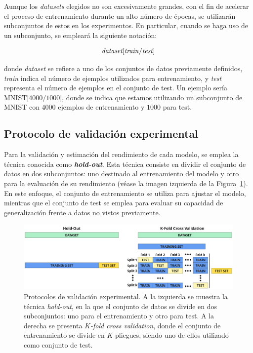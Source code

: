Aunque los \textit{datasets} elegidos no son excesivamente grandes, con el fin de acelerar el proceso de entrenamiento durante un alto número de épocas, se utilizarán subconjuntos de estos en los experimentos. En particular, cuando se haga uso de un subconjunto, se empleará la siguiente notación:

\[
    \textit{dataset}[\text{\textit{train}/\textit{test}}]
\]

donde \textit{dataset} se refiere a uno de los conjuntos de datos previamente definidos, \textit{train} indica el número de ejemplos utilizados para entrenamiento, y \textit{test} representa el número de ejemplos en el conjunto de test. Un ejemplo sería MNIST[$4000/1000$], donde se indica que estamos utilizando un subconjunto de MNIST con $4000$ ejemplos de entrenamiento y $1000$ para test.

\subsection{Protocolo de validación experimental}\label{subsec:protocolo-experimental}

Para la validación y estimación del rendimiento de cada modelo, se emplea la técnica conocida como \textbf{\textit{hold-out}}. Esta técnica consiste en dividir el conjunto de datos en dos subconjuntos: uno destinado al entrenamiento del modelo y otro para la evaluación de su rendimiento (véase la imagen izquierda de la Figura~\ref{fig:protocolos}). En este enfoque, el conjunto de entrenamiento se utiliza para ajustar el modelo, mientras que el conjunto de test se emplea para evaluar su capacidad de generalización frente a datos no vistos previamente. 

\begin{figure}[h]
    \centering
    \includegraphics[width=0.8\linewidth]{img/protocolo-experimental.png}
    \caption[Protocolos de validación experimental.]{Protocolos de validación experimental. A la izquierda se muestra la técnica \textit{hold-out}, en la que el conjunto de datos se divide en dos subconjuntos: uno para el entrenamiento y otro para test. A la derecha se presenta \textit{$K$-fold cross validation}, donde el conjunto de entrenamiento se divide en $K$ pliegues, siendo uno de ellos utilizado como conjunto de test.}\label{fig:protocolos}
\end{figure}

